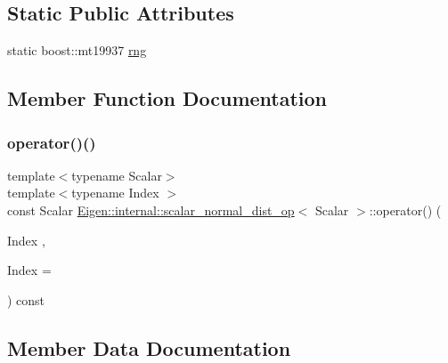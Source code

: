 \subsection*{Static Public Attributes}
\begin{DoxyCompactItemize}
\item 
static boost\+::mt19937 \hyperlink{structEigen_1_1internal_1_1scalar__normal__dist__op_aa088a6e6b0b17b44a1e409fd8e024969}{rng}
\end{DoxyCompactItemize}


\subsection{Member Function Documentation}
\mbox{\label{structEigen_1_1internal_1_1scalar__normal__dist__op_ac4016ae27250ae077c5ecc58465454ce}} 
\subsubsection{\texorpdfstring{operator()()}{operator()()}}
{\footnotesize\ttfamily template$<$typename Scalar$>$ \\
template$<$typename Index $>$ \\
const Scalar \hyperlink{structEigen_1_1internal_1_1scalar__normal__dist__op}{Eigen\+::internal\+::scalar\+\_\+normal\+\_\+dist\+\_\+op}$<$ Scalar $>$\+::operator() (\begin{DoxyParamCaption}\item[{Index}]{,  }\item[{Index}]{ = {} }\end{DoxyParamCaption}) const\hspace{0.3cm}{\ttfamily [inline]}}



\subsection{Member Data Documentation}
\mbox{\label{structEigen_1_1internal_1_1scalar__normal__dist__op_a2838ee2b54942da88f385babd6b01bbf}} 
